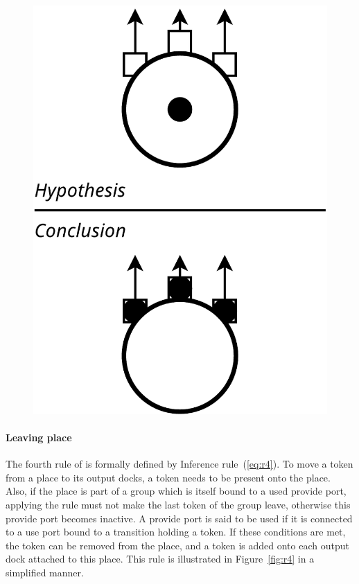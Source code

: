 {\begin{figure}[t]
\begin{minipage}[h]{0.45\columnwidth}
  \includegraphics[width=0.65\columnwidth]{./images/place_to_outputdocks.pdf}
\end{minipage}
\end{figure}

\paragraph{Leaving place}{

The fourth rule of \mad is formally defined by
Inference rule~(\ref{eq:r4}). To move a token from a place to its output
docks, a token needs to be present onto the place. Also, if the place
is part of a group which is itself bound to a used provide port,
applying the rule must not make the last token of the group leave,
otherwise this provide port becomes inactive. A provide port is said
to be used if it is connected to a use port bound to a transition
holding a token.  If these conditions are met, the token can be
removed from the place, and a token is added onto each output dock
attached to this place. This rule is illustrated in
Figure~\ref{fig:r4} in a simplified manner.

}

}
